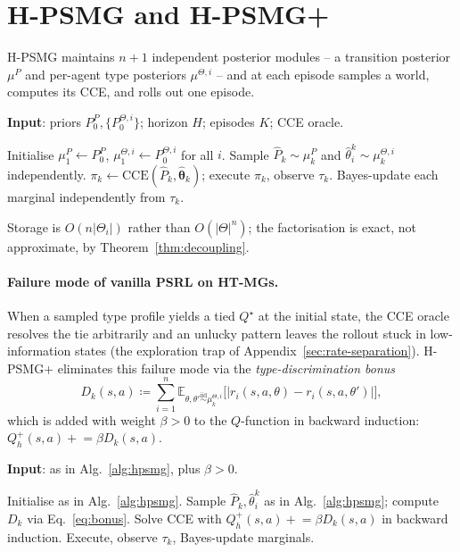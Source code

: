 ﻿\documentclass{article}
\def\textsuperscript#1{#1}%
\begin{document}
\section{H-PSMG and H-PSMG\textsuperscript{+}}
\label{sec:algorithm}

H-PSMG maintains $n{+}1$ independent posterior modules -- a transition posterior $\mu^P$ and per-agent type posteriors $\mu^{\Theta,i}$ -- and at each episode samples a world, computes its CCE, and rolls out one episode.

\begin{algorithm}[t]
\caption{H-PSMG}\label{alg:hpsmg}
\textbf{Input}: priors $P_0^P,\{P_0^{\Theta,i}\}$; horizon $H$; episodes $K$; CCE oracle.\\
\begin{algorithmic}[1]
\STATE Initialise $\mu_1^P\!\gets\! P_0^P$, $\mu_1^{\Theta,i}\!\gets\! P_0^{\Theta,i}$ for all $i$.
  \STATE Sample $\hat P_k\!\sim\!\mu_k^P$ and $\hat\theta_i^k\!\sim\!\mu_k^{\Theta,i}$ independently.
  \STATE $\pi_k\gets\mathrm{CCE}(\hat P_k,\hat{\boldsymbol\theta}_k)$; execute $\pi_k$, observe $\tau_k$.
  \STATE Bayes-update each marginal independently from $\tau_k$.
\ENDFOR
\end{algorithmic}
\end{algorithm}

Storage is $O(n|\Theta_i|)$ rather than $O(|\Theta|^n)$; the factorisation is exact, not approximate, by Theorem~\ref{thm:decoupling}.

\paragraph{Failure mode of vanilla PSRL on HT-MGs.} When a sampled type profile yields a tied $Q^\star$ at the initial state, the CCE oracle resolves the tie arbitrarily and an unlucky pattern leaves the rollout stuck in low-information states (the exploration trap of Appendix~\ref{sec:rate-separation}). H-PSMG\textsuperscript{+} eliminates this failure mode via the \emph{type-discrimination bonus}
\begin{equation}
\label{eq:bonus}
D_k(s,a)\coloneqq\sum_{i=1}^n\mathbb{E}_{\theta,\theta'\stackrel{\mathrm{iid}}{\sim}\mu_k^{\Theta,i}}\!\big[|r_i(s,a,\theta)-r_i(s,a,\theta')|\big],
\end{equation}
which is added with weight $\beta>0$ to the $Q$-function in backward induction: $Q^+_h(s,a)\mathrel{+}=\beta D_k(s,a)$.

\begin{algorithm}[t]
\caption{H-PSMG\textsuperscript{+}}\label{alg:hpsmg-plus}
\textbf{Input}: as in Alg.~\ref{alg:hpsmg}, plus $\beta>0$.\\
\begin{algorithmic}[1]
\STATE Initialise as in Alg.~\ref{alg:hpsmg}.
  \STATE Sample $\hat P_k,\hat\theta_i^k$ as in Alg.~\ref{alg:hpsmg}; compute $D_k$ via Eq.~\eqref{eq:bonus}.
  \STATE Solve CCE with $Q^+_h(s,a)\mathrel{+}=\beta D_k(s,a)$ in backward induction.
  \STATE Execute, observe $\tau_k$, Bayes-update marginals.
\ENDFOR
\end{algorithmic}
\end{algorithm}
\end{document}
